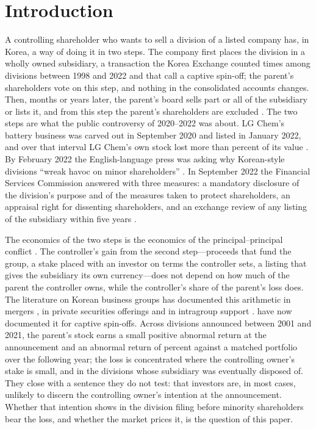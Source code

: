 \section{Introduction}\label{sec:intro}

A controlling shareholder who wants to sell a division of a listed company has, in Korea, a way of doing it in two steps. The company first places the division in a wholly owned subsidiary, a transaction the Korea Exchange counted \KLKrxCaptive{} times among \KLKrxTotal{} divisions between 1998 and 2022 and that  call a captive spin-off; the parent's shareholders vote on this step, and nothing in the consolidated accounts changes. Then, months or years later, the parent's board sells part or all of the subsidiary or lists it, and from this step the parent's shareholders are excluded \cite{kang2025}. The two steps are what the public controversy of 2020--2022 was about. LG Chem's battery business was carved out in September 2020 and listed in January 2022, and over that interval LG Chem's own stock lost more than \KLLGDrop{} percent of its value \cite{kang2025}. By February 2022 the English-language press was asking why Korean-style divisions ``wreak havoc on minor shareholders'' \cite{park2022}. In September 2022 the Financial Services Commission answered with three measures: a mandatory disclosure of the division's purpose and of the measures taken to protect shareholders, an appraisal right for dissenting shareholders, and an exchange review of any listing of the subsidiary within five years \cite{fsc2022a}.

The economics of the two steps is the economics of the principal--principal conflict \cite{young2008}. The controller's gain from the second step---proceeds that fund the group, a stake placed with an investor on terms the controller sets, a listing that gives the subsidiary its own currency---does not depend on how much of the parent the controller owns, while the controller's share of the parent's loss does. The literature on Korean business groups has documented this arithmetic in mergers \cite{bae2002}, in private securities offerings \cite{baek2006} and in intragroup support \cite{bae2008}.  have now documented it for captive spin-offs. Across \KLN{} divisions announced between 2001 and 2021, the parent's stock earns a small positive abnormal return at the announcement and an abnormal return of \KLBharOne{} percent against a matched portfolio over the following year; the loss is concentrated where the controlling owner's stake is small, and in the divisions whose subsidiary was eventually disposed of. They close with a sentence they do not test: that investors are, in most cases, unlikely to discern the controlling owner's intention at the announcement. Whether that intention shows in the division filing before minority shareholders bear the loss, and whether the market prices it, is the question of this paper.

